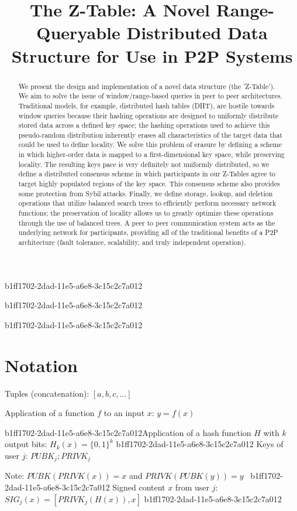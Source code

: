 \documentclass[12pt]{article}
\title{The Z-Table: A Novel Range-Queryable Distributed Data Structure for Use in P2P Systems}
\begin{document}
b1ff1702-2dad-11e5-a6e8-3c15c2c7a012
\maketitle
b1ff1702-2dad-11e5-a6e8-3c15c2c7a012
\begin{abstract}
We present the design and implementation of a novel data structure (the 'Z-Table'). We aim to solve the issue of window/range-based queries in peer to peer architectures. Traditional models, for example,  distributed hash tables (DHT), are hostile towards window queries because their hashing operations are designed to uniformly distribute stored data across a defined key space; the hashing operations used to achieve this pseudo-random distribution inherently erases all characteristics of the target data that could be used to define locality. We solve this problem of erasure by defining a scheme in which higher-order data is mapped to a first-dimensional key space, while preserving locality. The resulting keys pace is very definitely not uniformly distributed, so we define a distributed consensus scheme in which participants in our Z-Tables agree to target highly populated regions of the key space. This consensus scheme also provides some protection from Sybil attacks. Finally, we define storage, lookup, and deletion operations that utilize balanced search trees to efficiently perform necessary network functions; the preservation of locality allows us to greatly optimize these operations through the use of balanced trees. A peer to peer communication system acts as the underlying network for participants, providing all of the traditional benefits of a P2P architecture (fault tolerance, scalability, and truly independent operation).
\end{abstract}
b1ff1702-2dad-11e5-a6e8-3c15c2c7a012
\section{Notation}

Tuples (concatenation): $[a,b,c,...]$

Application of a function $f$ to an input $x$: $y=f(x)$

b1ff1702-2dad-11e5-a6e8-3c15c2c7a012Application of a hash function $H$ with $k$ output bits: $H_{k}(x) = \{0,1\}^k$
b1ff1702-2dad-11e5-a6e8-3c15c2c7a012
Keys of user $j$: $ PUBK_j; PRIVK_j $

Note: $PUBK(PRIVK(x)) = x$ and $PRIVK(PUBK(y)) = y$~
b1ff1702-2dad-11e5-a6e8-3c15c2c7a012
Signed content $x$ from user $j$: $SIG_j(x) = \left[ PRIVK_j( H(x) ), x \right]$
b1ff1702-2dad-11e5-a6e8-3c15c2c7a012
\end{document}
